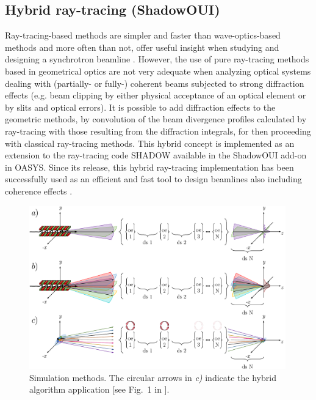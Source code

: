 \documentclass{iucr}              %
\begin{document}
\subsection{Hybrid ray-tracing (ShadowOUI)}

Ray-tracing-based methods are simpler and faster than wave-optics-based methods and more often than not, offer useful insight when studying and designing a synchrotron beamline \cite{hierarchical}. However, the use of pure ray-tracing methods based in geometrical optics are not very adequate when analyzing optical systems dealing with (partially- or fully-) coherent beams subjected to strong diffraction effects (e.g. beam clipping by either physical acceptance of an optical element or by slits and optical errors). It is possible to add diffraction effects to the geometric methods, by convolution of the beam divergence profiles calculated by ray-tracing with those resulting from the diffraction integrals, for then proceeding with classical ray-tracing methods. This hybrid concept \cite{codeHYBRID} is implemented as an extension to the ray-tracing code SHADOW \cite{codeSHADOW} available in the ShadowOUI \cite{codeSHADOWOUI} add-on in OASYS. Since its release, this hybrid ray-tracing implementation has been successfully used as an efficient and fast tool to design beamlines also including coherence effects \cite{Shi2017,Luca2020, Lordano2022}.

\begin{figure}\label{fig:sim_meth}
    \centering
    \includegraphics[width=0.99\textwidth]{simulation_methods.pdf}
    \caption{Simulation methods. The circular arrows in \textit{c)} indicate the hybrid algorithm application [see Fig.~1 in \cite{codeHYBRID}].}
\end{figure}
\end{document}
